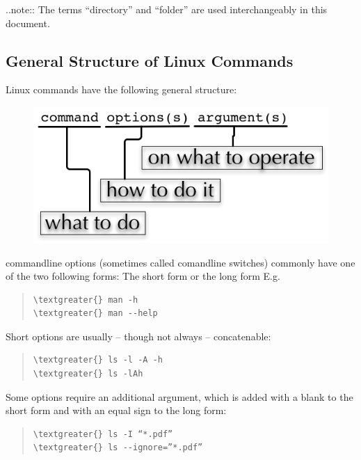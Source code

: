 \documentclass[letterpaper,10pt,english]{sphinxmanual}
\begin{document}
..note:: The terms “directory” and “folder” are used interchangeably in this document.


\subsection{General Structure of Linux Commands}
\label{IntroToCommandLine:general-structure-of-linux-commands}
Linux commands have the following general structure:
\begin{figure}[htbp]
\centering

\includegraphics{_static/LinuxCommandStructure.png}
\end{figure}

commandline options (sometimes called comandline switches) commonly have one of the two following forms: The short form  or the long form  E.g.
\begin{quote}

\begin{Verbatim}[commandchars=\\\{\}]
\textgreater{} man -h
\textgreater{} man --help
\end{Verbatim}
\end{quote}

Short options are usually – though not always – concatenable:
\begin{quote}

\begin{Verbatim}[commandchars=\\\{\}]
\textgreater{} ls -l -A -h
\textgreater{} ls -lAh
\end{Verbatim}
\end{quote}

Some options require an additional argument, which is added with a blank to the short form and with an equal sign to the long form:
\begin{quote}

\begin{Verbatim}[commandchars=\\\{\}]
\textgreater{} ls -I “*.pdf”
\textgreater{} ls --ignore=”*.pdf”
\end{Verbatim}
\end{quote}
\end{document}
